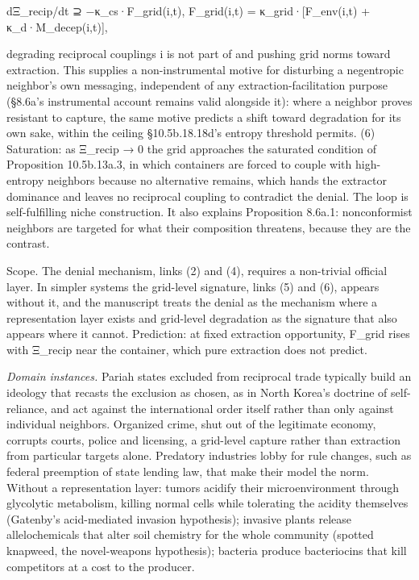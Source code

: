 \documentclass[
]{article}
\begin{document}
dΞ\_recip/dt ⊇ −κ\_cs·F\_grid(i,t), F\_grid(i,t) =
κ\_grid·{[}F\_env(i,t) + κ\_d·M\_decep(i,t){]},

degrading reciprocal couplings i is not part of and pushing grid norms
toward extraction. This supplies a non-instrumental motive for
disturbing a negentropic neighbor's own messaging, independent of any
extraction-facilitation purpose (§8.6a's instrumental account remains
valid alongside it): where a neighbor proves resistant to capture, the
same motive predicts a shift toward degradation for its own sake, within
the ceiling §10.5b.18.18d's entropy threshold permits. (6) Saturation:
as Ξ\_recip → 0 the grid approaches the saturated condition of
Proposition 10.5b.13a.3, in which containers are forced to couple with
high-entropy neighbors because no alternative remains, which hands the
extractor dominance and leaves no reciprocal coupling to contradict the
denial. The loop is self-fulfilling niche construction. It also explains
Proposition 8.6a.1: nonconformist neighbors are targeted for what their
composition threatens, because they are the contrast.

Scope. The denial mechanism, links (2) and (4), requires a non-trivial
official layer. In simpler systems the grid-level signature, links (5)
and (6), appears without it, and the manuscript treats the denial as the
mechanism where a representation layer exists and grid-level degradation
as the signature that also appears where it cannot. Prediction: at fixed
extraction opportunity, F\_grid rises with Ξ\_recip near the container,
which pure extraction does not predict.

\emph{Domain instances.} Pariah states excluded from reciprocal trade
typically build an ideology that recasts the exclusion as chosen, as in
North Korea's doctrine of self-reliance, and act against the
international order itself rather than only against individual
neighbors. Organized crime, shut out of the legitimate economy, corrupts
courts, police and licensing, a grid-level capture rather than
extraction from particular targets alone. Predatory industries lobby for
rule changes, such as federal preemption of state lending law, that make
their model the norm. Without a representation layer: tumors acidify
their microenvironment through glycolytic metabolism, killing normal
cells while tolerating the acidity themselves (Gatenby's acid-mediated
invasion hypothesis); invasive plants release allelochemicals that alter
soil chemistry for the whole community (spotted knapweed, the
novel-weapons hypothesis); bacteria produce bacteriocins that kill
competitors at a cost to the producer.
\end{document}
